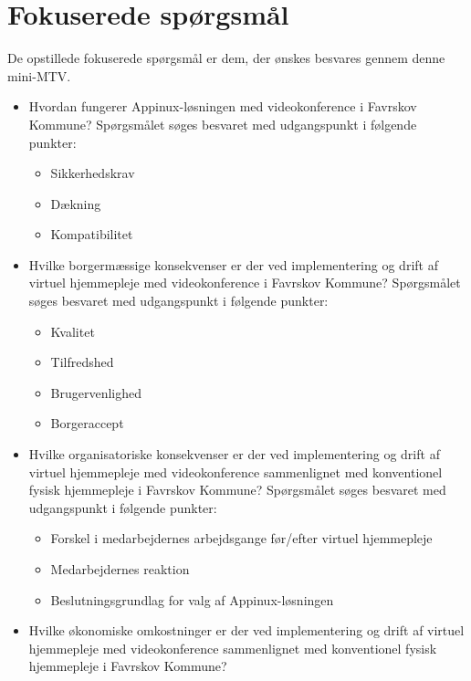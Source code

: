 \section{Fokuserede spørgsmål}
De opstillede fokuserede spørgsmål er dem, der ønskes besvares gennem denne mini-MTV. 

\begin{itemize}
	\item Hvordan fungerer Appinux-løsningen med videokonference i Favrskov Kommune? Spørgsmålet søges besvaret med udgangspunkt i følgende punkter:
	\begin{itemize}
	\item Sikkerhedskrav
	\item Dækning %
	\item Kompatibilitet 
\end{itemize}
\end{itemize}

\begin{itemize}
	\item Hvilke borgermæssige konsekvenser er der ved implementering og drift af virtuel hjemmepleje med videokonference i Favrskov Kommune? Spørgsmålet søges besvaret med udgangspunkt i følgende punkter:
	\begin{itemize}
	\item Kvalitet 
	\item Tilfredshed
	\item Brugervenlighed
	\item Borgeraccept
\end{itemize}
\end{itemize}

\begin{itemize}
	\item Hvilke organisatoriske konsekvenser er der ved implementering og drift af virtuel hjemmepleje med videokonference sammenlignet med konventionel fysisk hjemmepleje i Favrskov Kommune? Spørgsmålet søges besvaret med udgangspunkt i følgende punkter:
	\begin{itemize}
	\item Forskel i medarbejdernes arbejdsgange før/efter virtuel hjemmepleje
	\item Medarbejdernes reaktion
	\item Beslutningsgrundlag for valg af Appinux-løsningen 
\end{itemize}
\end{itemize}


\begin{itemize}
	\item Hvilke økonomiske omkostninger er der ved implementering og drift af virtuel hjemmepleje med videokonference sammenlignet med konventionel fysisk hjemmepleje i Favrskov Kommune?
\end{itemize}

